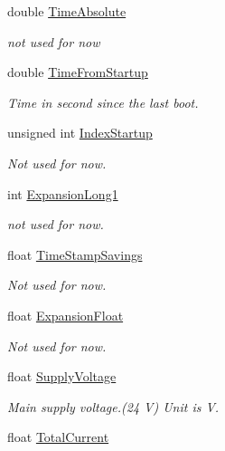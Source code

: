 \begin{DoxyCompactItemize}
\item 
double \hyperlink{struct_general_informations_ab2950271f954d901892257e5364e0d64}{Time\+Absolute}
\begin{DoxyCompactList}\small\item\em not used for now \end{DoxyCompactList}\item 
double \hyperlink{struct_general_informations_ab88ee4b89e5244ada283aa21dd33bd39}{Time\+From\+Startup}
\begin{DoxyCompactList}\small\item\em Time in second since the last boot. \end{DoxyCompactList}\item 
unsigned int \hyperlink{struct_general_informations_a112f455e7548254c639cbbc134eeaecc}{Index\+Startup}
\begin{DoxyCompactList}\small\item\em Not used for now. \end{DoxyCompactList}\item 
int \hyperlink{struct_general_informations_a4df94507a8b8f6bfdc84eedaf2d47f8f}{Expansion\+Long1}
\begin{DoxyCompactList}\small\item\em not used for now. \end{DoxyCompactList}\item 
float \hyperlink{struct_general_informations_a9175b100c45576a34acd3524e00d7d0c}{Time\+Stamp\+Savings}
\begin{DoxyCompactList}\small\item\em Not used for now. \end{DoxyCompactList}\item 
float \hyperlink{struct_general_informations_a8641ff908d6f15eb4c3984515e369dde}{Expansion\+Float}
\begin{DoxyCompactList}\small\item\em Not used for now. \end{DoxyCompactList}\item 
float \hyperlink{struct_general_informations_a447fdb3bf03c52d0e173302fcdf27f07}{Supply\+Voltage}
\begin{DoxyCompactList}\small\item\em Main supply voltage.(24 V) Unit is V. \end{DoxyCompactList}\item 
float \hyperlink{struct_general_informations_a6bce22c0c87b7c9696968182a8463a3e}{Total\+Current}

\end{DoxyCompactItemize}
